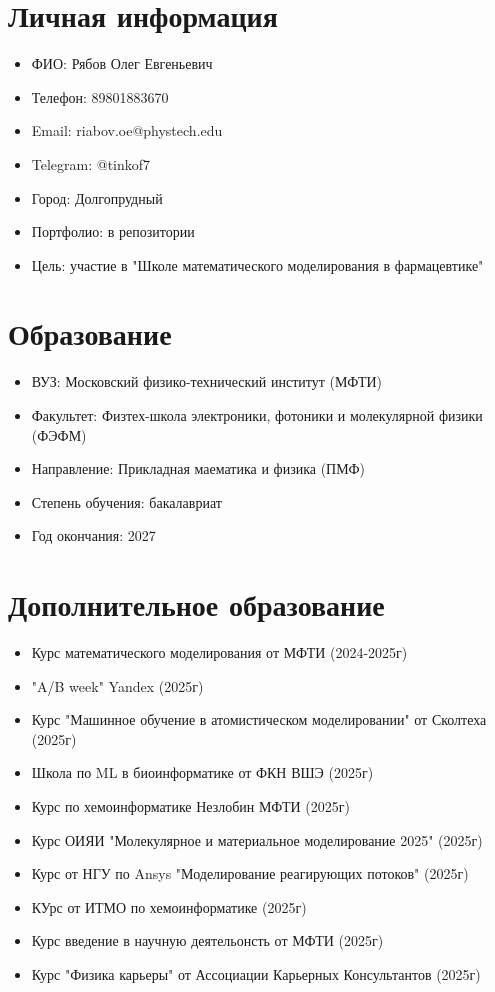 \documentclass[a4paper, 12pt]{article}
\begin{document}
\section{Личная информация}
\begin{itemize}
    \item ФИО: Рябов Олег Евгеньевич
    \item Телефон: 89801883670
    \item Email: riabov.oe@phystech.edu
    \item Telegram: @tinkof7
    \item Город: Долгопрудный
    \item Портфолио: в репозитории
    \item Цель: участие в "Школе математического моделирования в фармацевтике"
\end{itemize}	

\section{Образование}
\begin{itemize}
    \item ВУЗ: Московский физико-технический институт (МФТИ)
    \item Факультет: Физтех-школа электроники, фотоники и молекулярной физики (ФЭФМ)
    \item Направление: Прикладная маематика и физика (ПМФ)
    \item Степень обучения: бакалавриат
    \item Год окончания: 2027 
\end{itemize}

\section{Дополнительное образование}
\begin{itemize}
    \item Курс математического моделирования от МФТИ (2024-2025г)
    \item "A/B week" Yandex (2025г)
    \item Курс "Машинное обучение в атомистическом моделировании" от Сколтеха (2025г)
    \item Школа по ML в биоинформатике от ФКН ВШЭ (2025г)
    \item Курс по хемоинформатике Незлобин МФТИ (2025г)
    \item Курс ОИЯИ "Молекулярное и материальное моделирование 2025" (2025г)
    \item Курс от НГУ по Ansys "Моделирование реагирующих потоков" (2025г)
    \item КУрс от ИТМО по хемоинформатике (2025г)
    \item Курс введение в научную деятельонсть от МФТИ (2025г)
    \item Курс "Физика карьеры" от Ассоциации Карьерных Консультантов (2025г)
\end{itemize}
\end{document}

